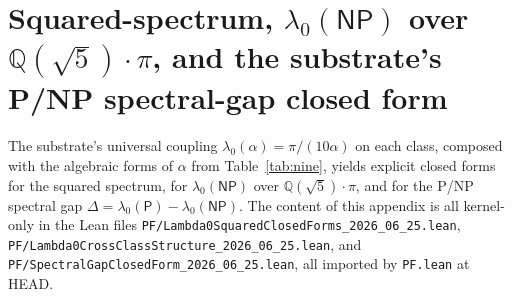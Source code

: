 \documentclass[11pt,a4paper]{amsart}
\theoremstyle{plain}
\theoremstyle{definition}
\begin{document}
\section{Squared-spectrum, $\lambda_0(\textsf{NP})$ over $\mathbb{Q}(\sqrt{5})\cdot\pi$, and the substrate's P/NP spectral-gap closed form}\label{app:lambdasq}

The substrate's universal coupling $\lambda_0(\alpha) = \pi/(10\alpha)$ on each class, composed with the algebraic forms of $\alpha$ from Table~\ref{tab:nine}, yields explicit closed forms for the squared spectrum, for $\lambda_0(\textsf{NP})$ over $\mathbb{Q}(\sqrt{5})\cdot\pi$, and for the P/NP spectral gap $\Delta = \lambda_0(\textsf{P}) - \lambda_0(\textsf{NP})$. The content of this appendix is all kernel-only in the Lean files \texttt{PF/Lambda0SquaredClosedForms\_2026\_06\_25.lean}, \texttt{PF/Lambda0CrossClassStructure\_2026\_06\_25.lean}, and \texttt{PF/SpectralGapClosedForm\_2026\_06\_25.lean}, all imported by \texttt{PF.lean} at HEAD.
\end{document}
